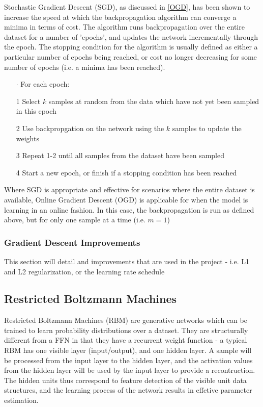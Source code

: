 \documentclass[a4paper,latin]{paper}
\begin{document}
Stochastic Gradient Descent (SGD), as discussed in \ref{OGD}, has been shown to increase the speed at which the backpropagation algorithm can converge a minima in terms of cost. The algorithm runs backpropagation over the entire dataset for a number of 'epochs', and updates the network incrementally through the epoch. The stopping condition for the algorithm is usually defined as either a particular number of epochs being reached, or cost no longer decreasing for some number of epochs (i.e. a minima has been reached).

\begin{itemize}
	\item [$\cdot$] For each epoch:
	\item [1] Select $k$ samples at random from the data which have not yet been sampled in this epoch
	\item [2] Use backpropgation on the network using the $k$ samples to update the weights
	\item [3] Repeat 1-2 until all samples from the dataset have been sampled
	\item [4] Start a new epoch, or finish if a stopping condition has been reached
\end{itemize}

Where SGD is appropriate and effective for scenarios where the entire dataset is available, Online Gradient Descent (OGD) is applicable for when the model is learning in an online fashion. In this case, the backpropagation is run as defined above, but for only one sample at a time (i.e. $m=1$)

\subsubsection{Gradient Descent Improvements}\label{imp_gradientimprovements}

This section will detail and improvements that are used in the project - i.e. L1 and L2 regularization, or the learning rate schedule 

\subsection{Restricted Boltzmann Machines}\label{imp_rbm}

Restricted Boltzmann Machines (RBM) are generative networks which can be trained to learn probability distributions over a dataset. They are structurally different from a FFN in that they have a recurrent weight function - a typical RBM has one visible layer (input/output), and one hidden layer. A sample will be processed from the input layer to the hidden layer, and the activation values from the hidden layer will be used by the input layer to provide a recontruction. The hidden units thus correspond to feature detection of the visible unit data structures, and the learning process of the network results in effetive parameter estimation. 
\end{document}
